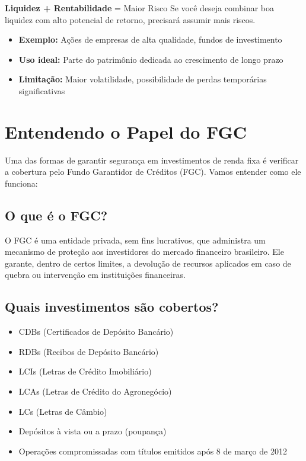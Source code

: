 \textbf{Liquidez + Rentabilidade} = Maior Risco
\noindent Se você deseja combinar boa liquidez com alto potencial de retorno, precisará assumir mais riscos.
\begin{itemize}[leftmargin=*]
    \item \textbf{Exemplo:} Ações de empresas de alta qualidade, fundos de investimento
    \item \textbf{Uso ideal:} Parte do patrimônio dedicada ao crescimento de longo prazo
    \item \textbf{Limitação:} Maior volatilidade, possibilidade de perdas temporárias significativas
\end{itemize}

\section{Entendendo o Papel do FGC}

\noindent Uma das formas de garantir segurança em investimentos de renda fixa é verificar a cobertura pelo Fundo Garantidor de Créditos (FGC). Vamos entender como ele funciona:

\subsection{O que é o FGC?}

\noindent O FGC é uma entidade privada, sem fins lucrativos, que administra um mecanismo de proteção aos investidores do mercado financeiro brasileiro. Ele garante, dentro de certos limites, a devolução de recursos aplicados em caso de quebra ou intervenção em instituições financeiras.

\subsection{Quais investimentos são cobertos?}

\begin{itemize}[leftmargin=*]
    \item CDBs (Certificados de Depósito Bancário)
    \item RDBs (Recibos de Depósito Bancário)
    \item LCIs (Letras de Crédito Imobiliário)
    \item LCAs (Letras de Crédito do Agronegócio)
    \item LCs (Letras de Câmbio)
    \item Depósitos à vista ou a prazo (poupança)
    \item Operações compromissadas com títulos emitidos após 8 de março de 2012
\end{itemize}

